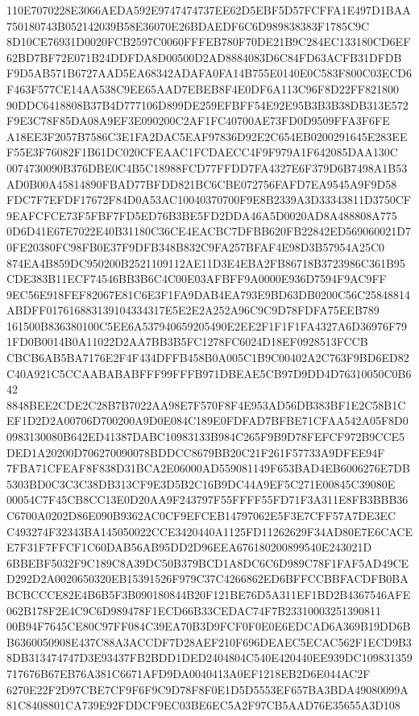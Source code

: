 \documentclass[UTF8,fontset=fandol,zihao=-4,a4paper]{ctexart}
\begin{document}
{{110E7070228E3066AEDA592E9747474737EE62D5EBF5D57FCFFA1E497D1BAA750180743B052142039B58E36070E26BDAEDF6C6D989838383F1785C9C
8D10CE76931D0020FCB2597C0060FFFEB780F70DE21B9C284EC133180CD6EF62BD7BF72E071B24DDFDA8D00500D2AD8884083D6C84FD63ACFB31DFDB
F9D5AB571B6727AAD5EA68342ADAFA0FA14B755E0140E0C583F800C03ECD6F463F577CE14AA538C9EE65AAD7EBEB8F4E0DF6A113C96F8D22FF821800
90DDC6418808B37B4D777106D899DE259EFBFF54E92E95B3B3B38DB313E572F9E3C78F85DA08A9EF3E090200C2AF1FC40700AE73FD0D9509FFA3F6FE
A18EE3F2057B7586C3E1FA2DAC5EAF97836D92E2C654EB0200291645E283EEF55E3F76082F1B61DC020CFEAAC1FCDAECC4F9F979A1F642085DAA130C
0074730090B376DBE0C4B5C18988FCD77FFDD7FA4327E6F379D6B7498A1B53AD0B00A45814890FBAD77BFDD821BC6CBE072756FAFD7EA9545A9F9D58
FDC7F7EFDF17672F84D0A53AC10040370700F9E8B2339A3D33343811D3750CF9EAFCFCE73F5FBF7FD5ED76B3BE5FD2DDA46A5D0020AD8A488808A775
0D6D41E67E7022E40B31180C36CE4EACBC7DFBB620FB22842ED569060021D70FE20380FC98FB0E37F9DFB348B832C9FA257BFAF4E98D3B57954A25C0
874EA4B859DC950200B2521109112AE11D3E4EBA2FB86718B3723986C361B95CDE383B11ECF74546BB3B6C4C00E03AFBFF9A0000E936D7594F9AC9FF
9EC56E918FEF82067E81C6E3F1FA9DAB4EA793E9BD63DB0200C56C25848814ABDFF017616883139104334317E5E2E2A252A96C9C9D78FDFA75EEB789
161500B836380100C5EE6A537940659205490E2EE2F1F1F1FA4327A6D36976F791FD0B0014B0A11022D2AA7BB3B5FC1278FC6024D18EF0928513FCCB
CBCB6AB5BA7176E2F4F434DFFB458B0A005C1B9C00402A2C763F9BD6ED82C40A921C5CCAABABABFFF99FFFB971DBEAE5CB97D9DD4D76310050C0B642
8848BEE2CDE2C28B7B7022AA98E7F570F8F4E953AD56DB383BF1E2C58B1CEF1D2D2A00706D700200A9D0E084C189E0FDFAD7BFBE71CFAA542A05F8D0
0983130080B642ED41387DABC10983133B984C265F9B9D78FEFCF972B9CCE5DED1A20200D706270090078BDDCC8679BB20C21F261F57733A9DFEE94F
7FBA71CFEAF8F838D31BCA2E06000AD559081149F653BAD4EB6006276E7DB5303BD0C3C3C38DB313CF9E3D5B2C16B9DC44A9EF5C271E00845C39080E
00054C7F45CB8CC13E0D20AA9F243797F55FFFF55FD71F3A311E8FB3BBB36C6700A0202D86E090B9362AC0CF9EFCEB14797062E5F3E7CFF57A7DE3EC
C493274F32343BA145050022CCE3420440A1125FD11262629F34AD80E7E6CACEE7F31F7FFCF1C60DAB56AB95DD2D96EEA676180200899540E243021D
6BBEBF5032F9C189C8A39DC50B379BCD1A8DC6C6D989C78F1FAF5AD49CED292D2A0020650320EB15391526F979C37C4266862ED6BFFCCBBFACDFB0BA
BCBCCCE82E4B6B5F3B090180844B20F121BE76D5A311EF1BD2B4367546AFE062B178F2E4C9C6D989478F1ECD66B33CEDAC74F7B23310003251390811
00B94F7645CE80C97FF084C39EA70B3D9FCF0F0E0E6EDCAD6A369B19DD6BB6360050908E437C88A3ACCDF7D28AEF210F696DEAEC5ECAC562F1ECD9B3
8DB313474747D3E93437FB2BDD1DED2404804C540E420440EE939DC109831359717676B67EB76A381C6671AFD9DA0040413A0EF1218EB2D6E044AC2F
6270E22F2D97CBE7CF9F6F9C9D78F8F0E1D5D5553EF657BA3BDA49080099A81C8408801CA739E92FDDCF9EC03BE6EC5A2F97CB5AAD76E35655A3D108
}}
\end{document}

